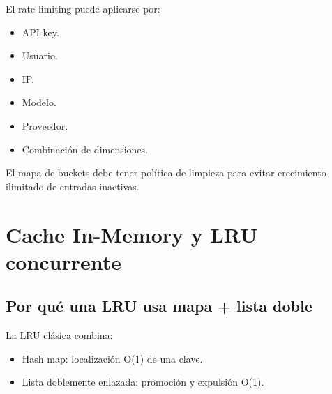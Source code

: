 \documentclass[11pt,a4paper]{article}
\begin{document}
El rate limiting puede aplicarse por:

\begin{itemize}
  \item API key.
  \item Usuario.
  \item IP.
  \item Modelo.
  \item Proveedor.
  \item Combinación de dimensiones.
\end{itemize}

El mapa de buckets debe tener política de limpieza para evitar crecimiento ilimitado de entradas inactivas.

\section{Cache In-Memory y LRU concurrente}

\subsection{Por qué una LRU usa mapa + lista doble}

La LRU clásica combina:

\begin{itemize}
  \item Hash map: localización O(1) de una clave.
  \item Lista doblemente enlazada: promoción y expulsión O(1).
\end{itemize}
\end{document}
